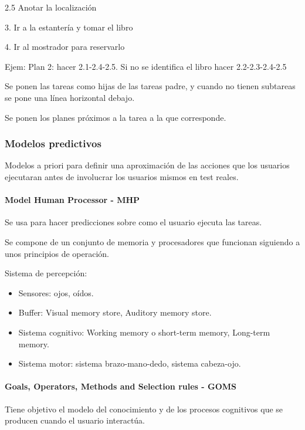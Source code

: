 \documentclass[12pt, twoside, openright]{report} %
\begin{document}
\hspace{.6cm} 2.5 Anotar la localización

3. Ir a la estantería y tomar el libro

4. Ir al mostrador para reservarlo

Ejem: Plan 2: hacer 2.1-2.4-2.5. Si no se identifica el
libro hacer 2.2-2.3-2.4-2.5

\begin{figure}[H]
	{\def\svgwidth{.8\textwidth}
     }
\end{figure}
Se ponen las tareas como hijas de las tareas padre, y cuando no
tienen subtareas se pone una línea horizontal debajo.

Se ponen los planes próximos a la tarea a la que corresponde.

\subsubsection{Modelos predictivos}
Modelos a priori para definir una
aproximación de las acciones que los usuarios ejecutaran antes de
involucrar los usuarios mismos en test reales.

\paragraph{Model Human Processor - MHP}
Se usa para hacer predicciones
sobre como el usuario ejecuta las tareas.


Se compone de un conjunto de memoria y procesadores que
funcionan siguiendo a unos principios de operación.

Sistema de percepción:

\begin{itemize}
	\item Sensores: ojos, oídos.
	\item Buffer: Visual memory store, Auditory memory store.
	\item Sistema cognitivo: Working memory o short-term memory,
	      Long-term memory.
	\item Sistema motor: sistema brazo-mano-dedo, sistema cabeza-ojo.
\end{itemize}
\pagebreak

\paragraph{Goals, Operators, Methods and Selection rules - GOMS}
Tiene objetivo el modelo del conocimiento y de los procesos cognitivos
que se producen cuando el usuario interactúa.
\end{document}
